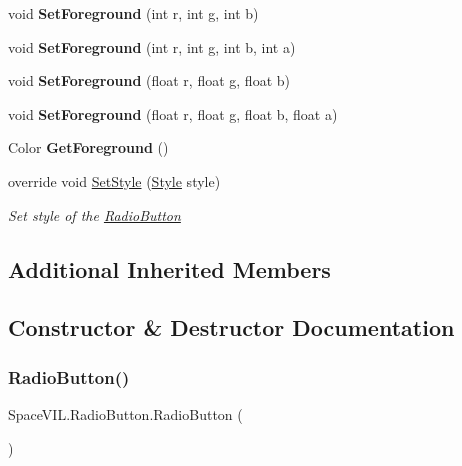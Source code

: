 \begin{DoxyCompactItemize}
void {\bfseries Set\+Foreground} (int r, int g, int b)
\item 
\mbox{\label{class_space_v_i_l_1_1_radio_button_ab300b014939a61279ee85e106a2efcb3}} 
void {\bfseries Set\+Foreground} (int r, int g, int b, int a)
\item 
\mbox{\label{class_space_v_i_l_1_1_radio_button_af77d57ae07d0da7b6d5e9a4435a8c178}} 
void {\bfseries Set\+Foreground} (float r, float g, float b)
\item 
\mbox{\label{class_space_v_i_l_1_1_radio_button_a8ffdbdee0c25b7a828bf2112bd358a62}} 
void {\bfseries Set\+Foreground} (float r, float g, float b, float a)
\item 
\mbox{\label{class_space_v_i_l_1_1_radio_button_a6952208113ed87d7cffad3929b8375e8}} 
Color {\bfseries Get\+Foreground} ()
\item 
override void \mbox{\hyperlink{class_space_v_i_l_1_1_radio_button_a35b4ba018fc4af405f853e6628fb5271}{Set\+Style}} (\mbox{\hyperlink{class_space_v_i_l_1_1_decorations_1_1_style}{Style}} style)
\begin{DoxyCompactList}\small\item\em Set style of the \mbox{\hyperlink{class_space_v_i_l_1_1_radio_button}{Radio\+Button}} \end{DoxyCompactList}\end{DoxyCompactItemize}
\subsection*{Additional Inherited Members}


\subsection{Constructor \& Destructor Documentation}
\mbox{\label{class_space_v_i_l_1_1_radio_button_af9c9ea2e77f10c292aa4337447d4c070}} 
\subsubsection{\texorpdfstring{Radio\+Button()}{RadioButton()}}
{\footnotesize\ttfamily Space\+V\+I\+L.\+Radio\+Button.\+Radio\+Button (\begin{DoxyParamCaption}{ }\end{DoxyParamCaption})}



